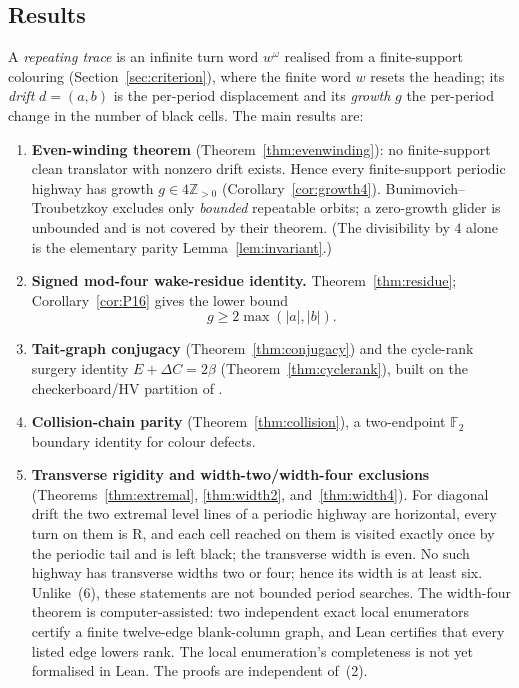\documentclass[11pt,reqno]{amsart}
\theoremstyle{plain}
\theoremstyle{definition}
\newcommand{\Z}{\mathbb{Z}}
\newcommand{\F}{\mathbb{F}}
\newcommand{\drift}{d}
\newcommand{\growth}{g}
\newcommand{\turnR}{\mathrm{R}}
\begin{document}
\subsection{Results}
A \emph{repeating trace} is an infinite turn word $w^\omega$ realised from a
finite-support colouring (Section~\ref{sec:criterion}), where the finite word $w$
resets the heading; its \emph{drift}
$\drift=(a,b)$ is the per-period displacement and its \emph{growth} $\growth$ the
per-period change in the number of black cells. The main results are:

\begin{enumerate}[leftmargin=2.4em,label=\textbf{(\arabic*)}]
\item \textbf{Even-winding theorem} (Theorem~\ref{thm:evenwinding}): no
finite-support clean translator with nonzero drift exists. Hence every
finite-support periodic highway has growth $\growth\in4\Z_{>0}$
(Corollary~\ref{cor:growth4}). Bunimovich--Troubetzkoy excludes only \emph{bounded}
repeatable orbits; a zero-growth glider is unbounded and is not covered by their
theorem. (The divisibility by $4$ alone is the
elementary parity Lemma~\ref{lem:invariant}.)

\item \textbf{Signed mod-four wake-residue identity.}
Theorem~\ref{thm:residue}; Corollary~\ref{cor:P16} gives the lower bound
\[
\growth\ge2\max(|a|,|b|).
\]

\item \textbf{Tait-graph conjugacy} (Theorem~\ref{thm:conjugacy}) and the cycle-rank
surgery identity $E+\Delta C=2\beta$ (Theorem~\ref{thm:cyclerank}), built on the
checkerboard/HV partition of \cite{GaleProppSutnerTroubetzkoy1995}.

\item \textbf{Collision-chain parity} (Theorem~\ref{thm:collision}), a two-endpoint
$\F_2$ boundary identity for colour defects.

\item \textbf{Transverse rigidity and width-two/width-four exclusions}
(Theorems~\ref{thm:extremal}, \ref{thm:width2}, and~\ref{thm:width4}). For diagonal drift the two
extremal level lines of a periodic highway are horizontal, every turn on them is
$\turnR$, and each cell reached on them is visited exactly once by the periodic tail
and is left black; the transverse width is even. No such highway has
transverse widths two or four; hence its width is at least six. Unlike~(6), these
statements are not bounded period searches.  The width-four theorem is
computer-assisted: two independent exact local enumerators certify a finite
twelve-edge blank-column graph, and Lean certifies that every listed edge lowers
rank.  The local enumeration's completeness is not yet formalised in Lean.  The
proofs are independent of~(2).


\end{enumerate}
\end{document}
